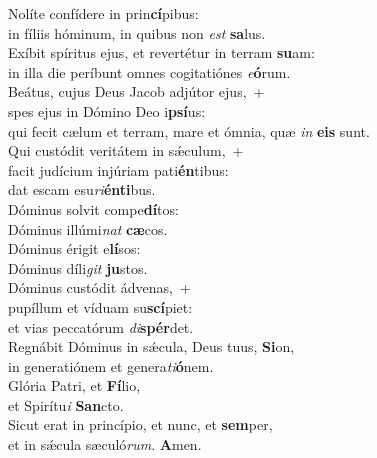 \evenverse Nolíte confídere in prin\textbf{cí}pibus:~\*\\
\evenverse in fíliis hóminum, in quibus non \textit{est} \textbf{sa}lus.\\
\oddverse Exíbit spíritus ejus, et revertétur in terram \textbf{su}am:~\*\\
\oddverse in illa die períbunt omnes cogitatiónes \textit{e}\textbf{ó}rum.\\
\evenverse Beátus, cujus Deus Jacob adjútor ejus,~+\\
\evenverse  spes ejus in Dómino Deo i\textbf{psí}us:~\*\\
\evenverse qui fecit cælum et terram, mare et ómnia, quæ \textit{in} \textbf{e}\textbf{is} sunt.\\
\oddverse Qui custódit veritátem in sǽculum,~+\\
\oddverse  facit judícium injúriam pati\textbf{én}tibus:~\*\\
\oddverse dat escam esu\textit{ri}\textbf{én}\textbf{ti}bus.\\
\evenverse Dóminus solvit compe\textbf{dí}tos:~\*\\
\evenverse Dóminus illúmi\textit{nat} \textbf{cæ}cos.\\
\oddverse Dóminus érigit e\textbf{lí}sos:~\*\\
\oddverse Dóminus díli\textit{git} \textbf{ju}stos.\\
\evenverse Dóminus custódit ádvenas,~+\\
\evenverse  pupíllum et víduam su\textbf{scí}piet:~\*\\
\evenverse et vias peccatórum \textit{di}\textbf{spér}det.\\
\oddverse Regnábit Dóminus in sǽcula, Deus tuus, \textbf{Si}on,~\*\\
\oddverse in generatiónem et genera\textit{ti}\textbf{ó}nem.\\
\evenverse Glória Patri, et \textbf{Fí}lio,~\*\\
\evenverse et Spirítu\textit{i} \textbf{San}cto.\\
\oddverse Sicut erat in princípio, et nunc, et \textbf{sem}per,~\*\\
\oddverse et in sǽcula sæculó\textit{rum}. \textbf{A}men.\\
